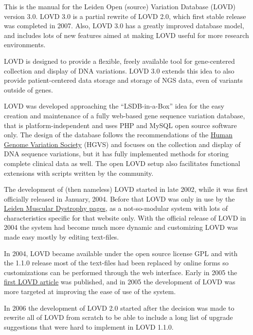 \documentclass[a4paper,oneside,openany,12pt]{memoir}
\begin{document}
This is the manual for the Leiden Open (source) Variation Database (LOVD) version 3.0.
LOVD 3.0 is a partial rewrite of LOVD 2.0, which first stable release was completed in 2007.
Also, LOVD 3.0 has a greatly improved database model, and includes lots of new features aimed at making LOVD useful for more research environments.
\par
LOVD is designed to provide a flexible, freely available tool for gene-centered collection and display of DNA variations.
LOVD 3.0 extends this idea to also provide patient-centered data storage and storage of NGS data, even of variants outside of genes.
\\
\par
LOVD was developed approaching the ``LSDB-in-a-Box'' idea for the easy creation and maintenance of a fully web-based gene sequence variation database,
that is platform-independent and uses PHP and MySQL open source software only.
The design of the database follows the recommendations of the \href{http://www.hgvs.org/}{Human Genome Variation Society} (HGVS)
and focuses on the collection and display of DNA sequence variations, but it has fully implemented methods for storing complete clinical data as well.
The open LOVD setup also facilitates functional extensions with scripts written by the community.
\\
\par
The development of (then nameless) LOVD started in late 2002, while it was first officially released in January, 2004.
Before that LOVD was only in use by the \href{http://www.DMD.nl/}{Leiden Muscular Dystrophy pages},
as a not-so-modular system with lots of characteristics specific for that website only.
With the official release of LOVD in 2004 the system had become much more dynamic and customizing LOVD was made easy mostly by editing text-files.
\par
In 2004, LOVD became available under the open source license GPL and with the 1.1.0 release most of the text-files had been replaced by online forms
so customizations can be performed through the web interface.
Early in 2005 the \href{http://www.ncbi.nlm.nih.gov/pubmed/15977173}{first LOVD article} was published,
and in 2005 the development of LOVD was more targeted at improving the ease of use of the system.
\\
\par
In 2006 the development of LOVD 2.0 started after the decision was made to rewrite all of LOVD from scratch
to be able to include a long list of upgrade suggestions that were hard to implement in LOVD 1.1.0.
\end{document}

